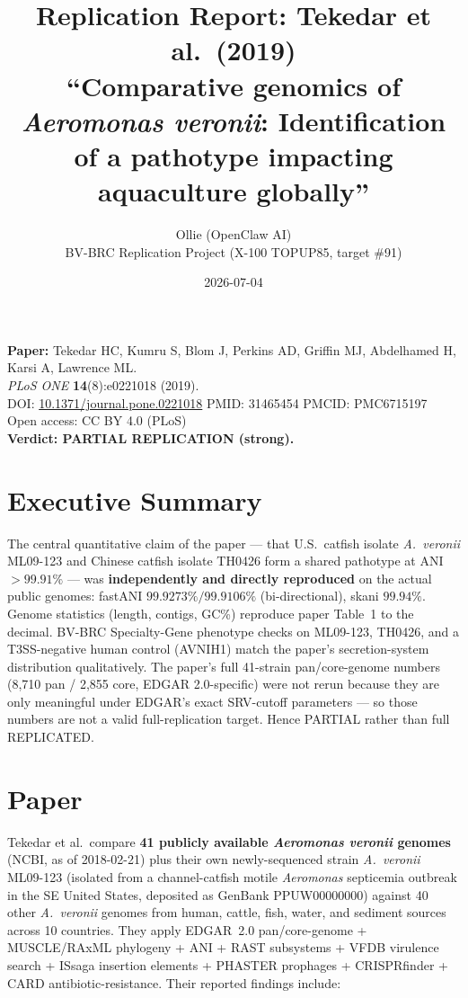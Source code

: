 \documentclass[11pt]{article}
\title{Replication Report: Tekedar et al.\ (2019)\\
\large ``Comparative genomics of \emph{Aeromonas veronii}: Identification of a pathotype impacting aquaculture globally''}
\author{Ollie (OpenClaw AI) \\ BV-BRC Replication Project (X-100 TOPUP85, target \#91)}
\date{2026-07-04}
\begin{document}
\maketitle

\begin{center}
\textbf{Paper:} Tekedar HC, Kumru S, Blom J, Perkins AD, Griffin MJ, Abdelhamed H, Karsi A, Lawrence ML.\\
\emph{PLoS ONE} \textbf{14}(8):e0221018 (2019).\\
DOI: \href{https://doi.org/10.1371/journal.pone.0221018}{10.1371/journal.pone.0221018} \quad
PMID: 31465454 \quad PMCID: PMC6715197\\
Open access: CC BY 4.0 (PLoS)\\[0.5em]
\textbf{Verdict: PARTIAL REPLICATION (strong).}
\end{center}

\section*{Executive Summary}

The central quantitative claim of the paper --- that U.S.\ catfish isolate
\emph{A.~veronii} ML09-123 and Chinese catfish isolate TH0426 form a shared
pathotype at ANI $> 99.91\%$ --- was \textbf{independently and directly
reproduced} on the actual public genomes: fastANI $99.9273\%/99.9106\%$
(bi-directional), skani $99.94\%$. Genome statistics (length, contigs, GC\%)
reproduce paper Table~1 to the decimal. BV-BRC Specialty-Gene phenotype checks
on ML09-123, TH0426, and a T3SS-negative human control (AVNIH1) match the
paper's secretion-system distribution qualitatively. The paper's full 41-strain
pan/core-genome numbers (8{,}710 pan / 2{,}855 core, EDGAR 2.0-specific) were
not rerun because they are only meaningful under EDGAR's exact SRV-cutoff
parameters --- so those numbers are not a valid full-replication target. Hence
PARTIAL rather than full REPLICATED.

\section{Paper}

Tekedar et al.\ compare \textbf{41 publicly available \emph{Aeromonas veronii}
genomes} (NCBI, as of 2018-02-21) plus their own newly-sequenced strain
\emph{A.~veronii} ML09-123 (isolated from a channel-catfish motile
\emph{Aeromonas} septicemia outbreak in the SE United States, deposited as
GenBank PPUW00000000) against 40 other \emph{A.~veronii} genomes from human,
cattle, fish, water, and sediment sources across 10 countries. They apply
EDGAR~2.0 pan/core-genome + MUSCLE/RAxML phylogeny + ANI + RAST subsystems +
VFDB virulence search + ISsaga insertion elements + PHASTER prophages +
CRISPRfinder + CARD antibiotic-resistance. Their reported findings include:
\end{document}
